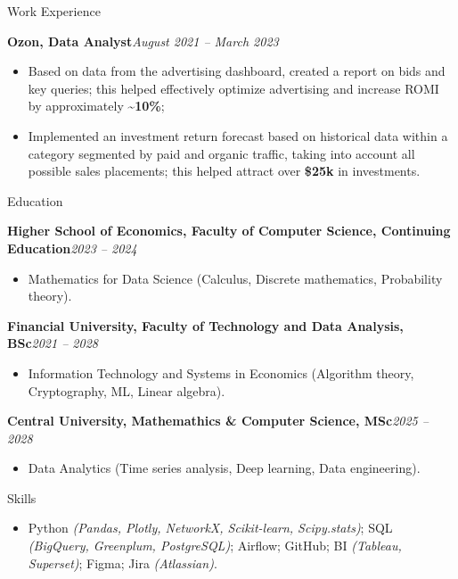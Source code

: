 \documentclass[]{mcdowellcv}
\renewenvironment{cvsubsection}[2]{%
  \begin{adjustwidth}{\subsectionmargin}{\subsectionmargin}%
    {\bfseries #1}\hfill #2\par\vspace{0.5em}%
}{%
  \end{adjustwidth}%
  \vspace*{\aftersubsectionspace}%
}
\begin{document}
\begin{cvsection}{\Large Work Experience}
		\begin{cvsubsection}{Ozon, Data Analyst}{\textit{August 2021 -- March 2023}}
			\begin{itemize}
				\item Based on data from the advertising dashboard, created a report on bids and key queries; this helped effectively optimize advertising and increase ROMI by approximately \textbf{\textasciitilde 10\%};
				\item Implemented an investment return forecast based on historical data within a category segmented by paid and organic traffic, taking into account all possible sales placements; this helped attract over \textbf{\$25k} in investments.
			\end{itemize}
		\end{cvsubsection}
	\end{cvsection}
	
	\begin{cvsection}{\Large Education}
		\begin{cvsubsection}{Higher School of Economics, Faculty of Computer Science, Continuing Education}{\textit{2023 -- 2024}}
			\begin{itemize}
				\item Mathematics for Data Science (Calculus, Discrete mathematics, Probability theory).
			\end{itemize}
		\end{cvsubsection}
		\begin{cvsubsection}{Financial University, Faculty of Technology and Data Analysis, BSc}{\textit{2021 -- 2028}}
			\begin{itemize}
				\item Information Technology and Systems in Economics (Algorithm theory, Cryptography, ML, Linear algebra).
			\end{itemize}
		\end{cvsubsection}
		\begin{cvsubsection}{Central University, Mathemathics \& Computer Science, MSc}{\textit{2025 -- 2028}}
			\begin{itemize}
				\item Data Analytics (Time series analysis, Deep learning, Data engineering).
			\end{itemize}
		\end{cvsubsection}
	\end{cvsection}
	
	\begin{cvsection}{\Large Skills}
		\begin{cvsubsection}{}{}{}	
			\begin{itemize}
				\item Python \textit{(Pandas, Plotly, NetworkX, Scikit-learn, Scipy.stats)}; SQL \textit{(BigQuery, Greenplum, PostgreSQL)}; Airflow; GitHub; BI \textit{(Tableau, Superset)}; Figma; Jira \textit{(Atlassian)}. 
			\end{itemize}
		\end{cvsubsection}
	\end{cvsection}
	
\end{document}
